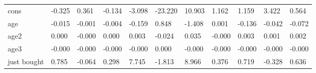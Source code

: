 \begin{table}[htbp]
\begin{tabular}{lllllllllll}
cons &    -0.325 &     0.361 &    -0.134 &    -3.098 &   -23.220 &    10.903 &     1.162 &     1.159 &     3.422 &     0.564 \\  
age &    -0.015 &    -0.001 &    -0.004 &    -0.159 &     0.848 &    -1.408 &     0.001 &    -0.136 &    -0.042 &    -0.072 \\  
age2 &     0.000 &    -0.000 &     0.000 &     0.003 &    -0.024 &     0.035 &    -0.000 &     0.003 &     0.001 &     0.002 \\  
age3 &    -0.000 &    -0.000 &    -0.000 &    -0.000 &     0.000 &    -0.000 &    -0.000 &    -0.000 &    -0.000 &    -0.000 \\  
just bought &     0.785 &    -0.064 &     0.298 &     7.745 &    -1.813 &     8.966 &     0.376 &     0.719 &    -0.328 &     0.636 \\  
\hline \hline \end{tabular}
\end{table}
